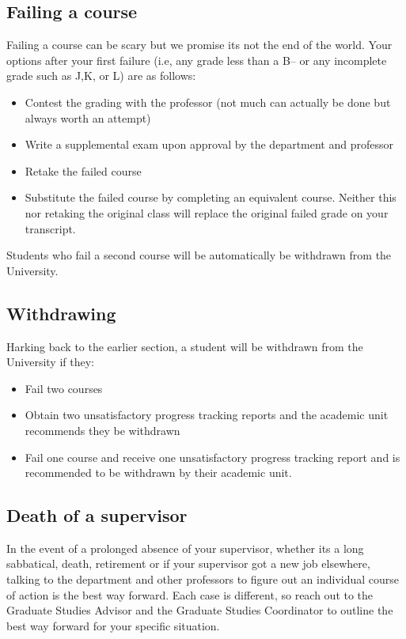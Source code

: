     \subsection{Failing a course}

    
    Failing a course can be scary but we promise its not the end of the world. Your options after your first failure (i.e, any grade less than a B-- or any incomplete grade such as J,K, or L) are as follows:
        \begin{itemize}
            \item Contest the grading with the professor (not much can actually be done but always worth an attempt)
            \item Write a supplemental exam upon approval by the department and professor
            \item Retake the failed course
            \item Substitute the failed course by completing an equivalent course. Neither this nor retaking the original class will replace the original failed grade on your transcript.
        \end{itemize}
        Students who fail a second course will be automatically be withdrawn from the University. 

    \subsection{Withdrawing} 
        Harking back to the earlier section, a student will be withdrawn from the University if they:
        \begin{itemize}
            \item Fail two courses
            \item Obtain two unsatisfactory progress tracking reports and the academic unit recommends they be withdrawn
            \item Fail one course and receive one unsatisfactory progress tracking report and is recommended to be withdrawn by their academic unit.
        \end{itemize}
        
    \subsection{Death of a supervisor}
        
        In the event of a prolonged absence of your supervisor, whether its a long sabbatical, death, retirement or if your supervisor got a new job elsewhere, talking to the department and other professors to figure out an individual course of action is the best way forward. Each case is different, so reach out to the Graduate Studies Advisor and the Graduate Studies Coordinator to outline the best way forward for your specific situation.
        
